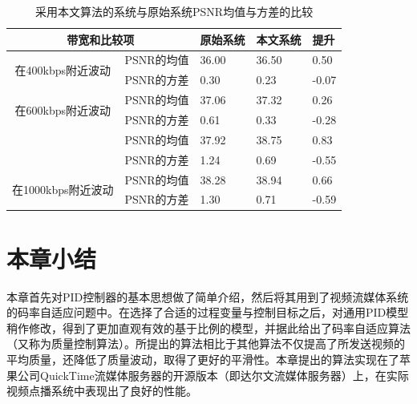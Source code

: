 \begin{table}[!ht]
	\centering
	\vspace{10pt}
	\caption{采用本文算法的系统与原始系统PSNR均值与方差的比较}
	\label{tab:improvement-combined}
	\small
	\begin{minipage}{1.0\linewidth}
		\centering
		\begin{tabular}{c|c|*{2}{p{2.0cm}<{\centering}|}p{2.0cm}<{\centering}}
			\hline \hline
			\multicolumn{2}{c|}{带宽和比较项} &
			{原始系统} & {本文系统} & {提升} \\ \hline 
			\multirow{2}{*}{在400kbps附近波动}
			& PSNR的均值
			& 36.00 & 36.50 & 0.50 \\ \cline{2-5}
			& PSNR的方差
			& 0.30 & 0.23 & -0.07 \\ \hline
			\multirow{2}{*}{在600kbps附近波动}
			& PSNR的均值 & 37.06 & 37.32 & 0.26 \\ \cline{2-5}
			& PSNR的方差 & 0.61 & 0.33 & -0.28 \\ \Xhline{2\arrayrulewidth}
			\multirow{2}{*}{在800kbps附近波动}
			& PSNR的均值 & 37.92 & 38.75 & 0.83 \\ \cline{2-5}
			& PSNR的方差 & 1.24 & 0.69 & -0.55 \\ \hline
			\multirow{2}{*}{在1000kbps附近波动}
			& PSNR的均值 & 38.28 & 38.94 & 0.66 \\ \cline{2-5}
			& PSNR的方差 & 1.30 & 0.71 & -0.59 \\ \hline
		\end{tabular}
	\end{minipage}
	\vspace{10pt}
\end{table}

\section{本章小结}

本章首先对PID控制器的基本思想做了简单介绍，然后将其用到了视频流媒体系统的码率自适应问题中。在选择了合适的过程变量与控制目标之后，对通用PID模型稍作修改，得到了更加直观有效的基于比例的模型，并据此给出了码率自适应算法（又称为质量控制算法）。所提出的算法相比于其他算法不仅提高了所发送视频的平均质量，还降低了质量波动，取得了更好的平滑性。本章提出的算法实现在了苹果公司QuickTime流媒体服务器的开源版本（即达尔文流媒体服务器）上，在实际视频点播系统中表现出了良好的性能。